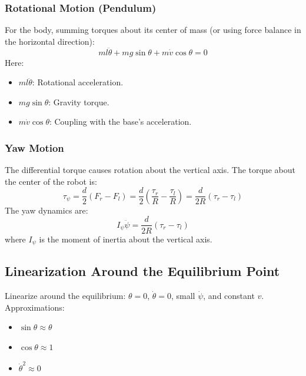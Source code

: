 \documentclass{article}
\begin{document}
\subsubsection{Rotational Motion (Pendulum)}

For the body, summing torques about its center of mass (or using force balance in the horizontal direction):
\begin{equation}
    m l \ddot{\theta} + m g \sin \theta + m \dot{v} \cos \theta = 0
\end{equation}
Here:
\begin{itemize}
    \item \( m l \ddot{\theta} \): Rotational acceleration.
    \item \( m g \sin \theta \): Gravity torque.
    \item \( m \dot{v} \cos \theta \): Coupling with the base's acceleration.
\end{itemize}

\subsubsection{Yaw Motion}

The differential torque causes rotation about the vertical axis. The torque about the center of the robot is:
\begin{equation}
    \tau_\psi = \frac{d}{2} (F_r - F_l) = \frac{d}{2} \left( \frac{\tau_r}{R} - \frac{\tau_l}{R} \right) = \frac{d}{2 R} (\tau_r - \tau_l)
\end{equation}
The yaw dynamics are:
\begin{equation}
    I_\psi \ddot{\psi} = \frac{d}{2 R} (\tau_r - \tau_l)
\end{equation}
where \( I_\psi \) is the moment of inertia about the vertical axis.

\subsection{Linearization Around the Equilibrium Point}

Linearize around the equilibrium: \( \theta = 0 \), \( \dot{\theta} = 0 \), small \( \dot{\psi} \), and constant \( v \). Approximations:
\begin{itemize}
    \item \( \sin \theta \approx \theta \)
    \item \( \cos \theta \approx 1 \)
    \item \( \dot{\theta}^2 \approx 0 \)
\end{itemize}
\end{document}
